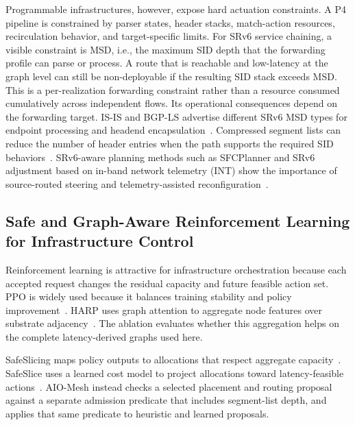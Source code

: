 \documentclass[final,5p]{elsarticle}
\newcommand{\rev}[1]{\textcolor{revisiongreen}{#1}}
\let\newrev\rev
\begin{document}
Programmable infrastructures, however, expose hard actuation constraints. A P4 pipeline is constrained by parser states, header stacks, match-action resources, recirculation behavior, and target-specific limits. For SRv6 service chaining, a visible constraint is \rev{MSD}, i.e., the maximum SID depth that the forwarding profile can parse or process. A route that is reachable and low-latency at the graph level can still be non-deployable if the resulting SID stack exceeds MSD. \rev{This is a per-realization forwarding constraint rather than a resource consumed cumulatively across independent flows. Its operational consequences depend on the forwarding target. IS-IS and BGP-LS advertise different SRv6 MSD types for endpoint processing and headend encapsulation~\cite{rfc9352,rfc9514}. Compressed segment lists can reduce the number of header entries when the path supports the required SID behaviors~\cite{rfc9800}.} SRv6-aware planning methods such as SFCPlanner and SRv6 adjustment based on \newrev{in-band network telemetry (INT)} show the importance of source-routed steering and telemetry-assisted reconfiguration~\cite{qiu2024sfcplanner,yan2024srv6int}.

\subsection{Safe and Graph-Aware Reinforcement Learning for Infrastructure Control}
\label{subsec:related_safe_rl}

Reinforcement learning is attractive for infrastructure orchestration because each accepted request changes the residual capacity and future feasible action set. PPO is widely used because it balances training stability and policy improvement~\cite{schulman2017proximal}. \newrev{HARP uses graph attention to aggregate node features over substrate adjacency~\cite{velickovic2018graph}. The ablation evaluates whether this aggregation helps on the complete latency-derived graphs used here.}

\newrev{SafeSlicing maps policy outputs to allocations that respect aggregate capacity~\cite{liu2021safeslicing}. SafeSlice uses a learned cost model to project allocations toward latency-feasible actions~\cite{nagib2025safeslice}. AIO-Mesh instead checks a selected placement and routing proposal against a separate admission predicate that includes segment-list depth, and applies that same predicate to heuristic and learned proposals.}
\end{document}
